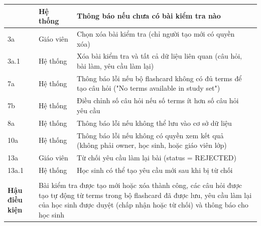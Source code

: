 \documentclass[../DoAn.tex]{subfiles}
\begin{document}
\begin{longtable}{|m{5cm}|m{2cm}|m{3cm}|m{3cm}|}
{\begin{tabular}{|m{1cm}|m{2cm}|m{4.7cm}|}
        \hline
        2a & Hệ thống & Thông báo nếu chưa có bài kiểm tra nào \\
        \hline
        3a & Giáo viên & Chọn xóa bài kiểm tra (chỉ người tạo mới có quyền xóa) \\
        \hline
        3a.1 & Hệ thống & Xóa bài kiểm tra và tất cả dữ liệu liên quan (câu hỏi, bài làm, yêu cầu làm lại) \\
        \hline
        7a & Hệ thống & Thông báo lỗi nếu bộ flashcard không có đủ terms để tạo câu hỏi ("No terms available in study set") \\
        \hline
        7b & Hệ thống & Điều chỉnh số câu hỏi nếu số terms ít hơn số câu hỏi yêu cầu \\
        \hline
        8a & Hệ thống & Thông báo lỗi nếu không thể lưu vào cơ sở dữ liệu \\
        \hline
        10a & Hệ thống & Thông báo lỗi nếu không có quyền xem kết quả (không phải owner, học sinh, hoặc giáo viên lớp) \\
        \hline
        13a & Giáo viên & Từ chối yêu cầu làm lại bài (status = REJECTED) \\
        \hline
        13a.1 & Hệ thống & Học sinh có thể tạo yêu cầu mới sau khi bị từ chối \\
        \hline
    \end{tabular}} \\
    \hline
    \multicolumn{1}{|m{4cm}|}{\textbf{Hậu điều kiện}} & \multicolumn{3}{|m{9cm}|}{Bài kiểm tra được tạo mới hoặc xóa thành công, các câu hỏi được tạo tự động từ terms trong bộ flashcard đã được lưu, yêu cầu làm lại của học sinh được duyệt (chấp nhận hoặc từ chối) và thông báo cho học sinh} \\
    \hline
\end{longtable}

\vspace{0.5cm}
\end{document}
